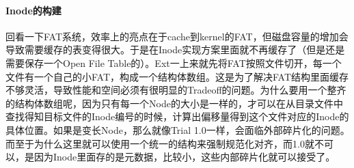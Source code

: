\documentclass[]{report}
\begin{document}
		\paragraph{Inode的构建}
		回看一下FAT系统，效率上的亮点在于cache到kernel的FAT，但磁盘容量的增加会导致需要缓存的表变得很大。于是在Inode实现方案里面就不再缓存了（但是还是需要保存一个Open File Table的）。Ext一上来就先将FAT按照文件切开，每一个文件有一个自己的小FAT，构成一个结构体数组。这是为了解决FAT结构里面缓存不够灵活，导致性能和空间必须有很明显的Tradeoff的问题。为什么要用一个整齐的结构体数组呢，因为只有每一个Node的大小是一样的，才可以在从目录文件中查找得知目标文件的Inode编号的时候，计算出偏移量得到这个文件对应的Inode的具体位置。如果是变长Node，那么就像Trial 1.0一样，会面临外部碎片化的问题。而至于为什么这里就可以使用一个统一的结构来强制规范化对齐，而1.0就不可以，是因为Inode里面存的是元数据，比较小，这些内部碎片化就可以接受了。
\end{document}
